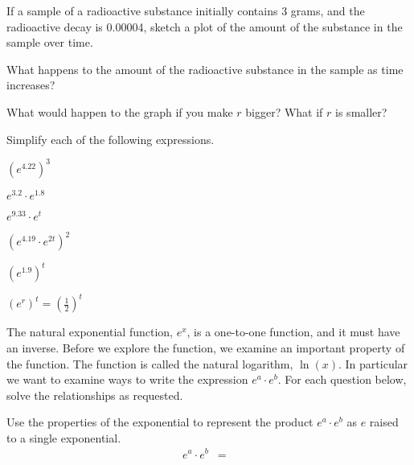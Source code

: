 \begin{problem}
\begin{subproblem}
  \item If a sample of a radioactive substance initially contains 3
    grams, and the radioactive decay is 0.00004, sketch a plot of the
    amount of the substance in the sample over time.
    
    \vfill

  \item What happens to the amount of the radioactive substance in the
    sample as time increases?
    
    \vspace{3em}

  \item What would happen to the graph if you make $r$ bigger? What if
    $r$ is smaller?

    \vspace{3em}


  \end{subproblem}

\clearpage

\item Simplify each of the following expressions.
  \begin{subproblem}
  \item ${\displaystyle \left(e^{4.22}\right)^3}$
    \vfill
  \item ${\displaystyle e^{3.2}\cdot e^{1.8}}$
    \vfill
  \item ${\displaystyle e^{9.33}\cdot e^{t}}$
    \vfill
  \item ${\displaystyle \left(e^{4.19}\cdot e^{2t}\right)^2}$
    \vfill
  \item ${\displaystyle \left(e^{1.9}\right)^t}$
    \vfill
  \item ${\displaystyle \left(e^r\right)^t = \left( \frac{1}{2} \right)^t}$
    \vfill
  \end{subproblem}

\clearpage

\item The natural exponential function, $e^x$, is a one-to-one
  function, and it must have an inverse. Before we explore the
  function, we examine an important property of the function. The
  function is called the natural logarithm, $\ln(x)$.  In particular
  we want to examine ways to write the expression $e^a\cdot e^b$. For
  each question below, solve the relationships as requested.
  \begin{subproblem}
  \item Use the properties of the exponential to represent the product
    $e^a\cdot e^b$ as $e$ raised to a single exponential.
    \label{subprob:exponentialExpansion}
    \begin{eqnarray}
      \label{eqn:exponentialExpansion}
      e^a \cdot e^b & = & 
    \end{eqnarray}
    

\end{subproblem}
\end{problem}
